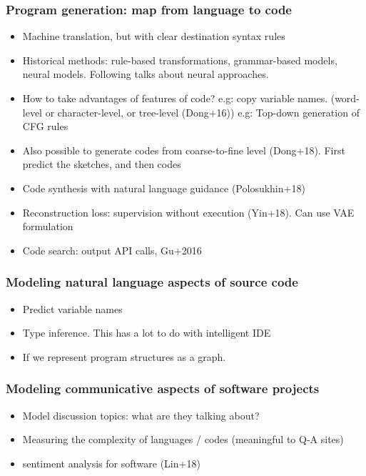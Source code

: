 \subsubsection{Program generation: map from language to code}
\begin{itemize}
	\item Machine translation, but with clear destination syntax rules
	\item Historical methods: rule-based transformations, grammar-based models, neural models. Following talks about neural approaches.
	\item How to take advantages of features of code? e.g: copy variable names. (word-level or character-level, or tree-level (Dong+16)) e.g: Top-down generation of CFG rules
	\item Also possible to generate codes from coarse-to-fine level (Dong+18). First predict the sketches, and then codes
	\item Code synthesis with natural language guidance (Polosukhin+18)
	\item Reconstruction loss: supervision without execution (Yin+18). Can use VAE formulation
	\item Code search: output API calls, Gu+2016 
\end{itemize}

\subsubsection{Modeling natural language aspects of source code}
\begin{itemize}
	\item Predict variable names
	\item Type inference. This has a lot to do with intelligent IDE
	\item If we represent program structures as a graph. 
\end{itemize}

\subsubsection{Modeling communicative aspects of software projects}
\begin{itemize}
	\item Model discussion topics: what are they talking about?
	\item Measuring the complexity of languages / codes (meaningful to Q-A sites)
	\item sentiment analysis for software (Lin+18)
\end{itemize}


